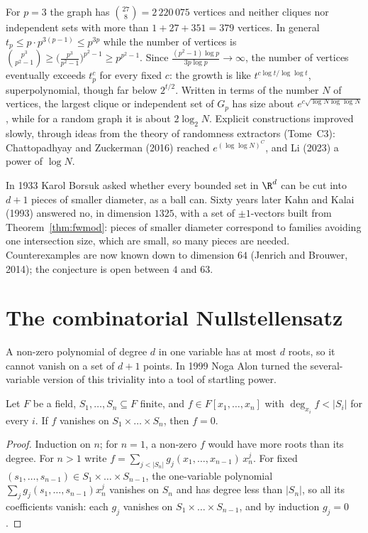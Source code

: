 For $p=3$ the graph has $\binom{27}8=2\,220\,075$ vertices and neither cliques nor independent sets with more than $1+27+351=379$ vertices. In general $t_p\le p\cdot p^{3(p-1)}\le p^{3p}$ while the number of vertices is
$\binom{p^3}{p^2-1}\ge\bigl(\frac{p^3}{p^2-1}\bigr)^{p^2-1}\ge p^{p^2-1}$. Since $\frac{(p^2-1)\log p}{3p\log p}\to\infty$, the number of vertices eventually exceeds $t_p^c$ for every fixed $c$: the growth is like $t^{c\log t/\log\log t}$,
superpolynomial, though far below $2^{t/2}$. Written in terms of the number $N$ of vertices, the largest clique or independent set of $G_p$ has size about $e^{c\sqrt{\log N\log\log N}}$, while for a random graph it is about $2\log_2N$. Explicit constructions
improved slowly, through ideas from the theory of randomness extractors (Tome~C3): Chattopadhyay and Zuckerman (2016) reached $e^{(\log\log N)^{C}}$, and Li (2023) a power of $\log N$.

\begin{remark}
In 1933 Karol Borsuk asked whether every bounded set in $\R^d$ can be cut into $d+1$ pieces of smaller diameter, as a ball can. Sixty years later Kahn and Kalai (1993) answered no, in dimension $1325$,
with a set of $\pm1$-vectors built from Theorem~\ref{thm:fwmod}: pieces of smaller diameter correspond to families avoiding one intersection size, which are small, so many pieces are needed. Counterexamples are
now known down to dimension $64$ (Jenrich and Brouwer, 2014); the conjecture is open between $4$ and $63$.
\end{remark}

\section{The combinatorial Nullstellensatz}

A non-zero polynomial of degree $d$ in one variable has at most $d$ roots, so it cannot vanish on a set of $d+1$ points. In 1999 Noga Alon turned the several-variable version of this triviality into a tool
of startling power.

\begin{lemma}\label{lem:grid}
Let $F$ be a field, $S_1,\dots,S_n\subseteq F$ finite, and $f\in F[x_1,\dots,x_n]$ with $\deg_{x_i}f<|S_i|$ for every $i$. If $f$ vanishes on $S_1\times\dots\times S_n$, then $f=0$.
\end{lemma}
\begin{proof}
Induction on $n$; for $n=1$, a non-zero $f$ would have more roots than its degree. For $n>1$ write $f=\sum_{j<|S_n|}g_j(x_1,\dots,x_{n-1})\,x_n^j$. For fixed $(s_1,\dots,s_{n-1})\in S_1\times\dots\times S_{n-1}$,
the one-variable polynomial $\sum_jg_j(s_1,\dots,s_{n-1})x_n^j$ vanishes on $S_n$ and has degree less than $|S_n|$, so all its coefficients vanish: each $g_j$ vanishes on $S_1\times\dots\times S_{n-1}$, and by induction $g_j=0$.
\end{proof}

